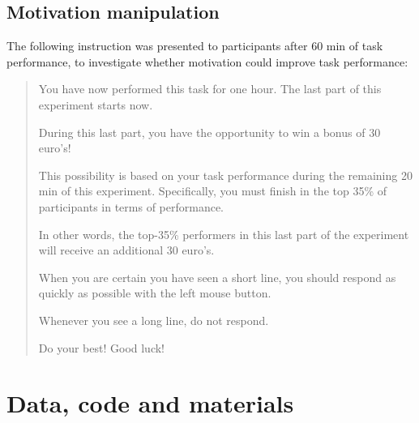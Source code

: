 \documentclass[11pt,]{memoir}
\renewcommand{\arraystretch}{1.5} %
\begin{document}
\hypertarget{motivation-manipulation}{%
\section{Motivation manipulation}\label{motivation-manipulation}}

The following instruction was presented to participants after 60 min of task performance, to investigate whether motivation could improve task performance:

\begin{quote}
You have now performed this task for one hour. The last part of this experiment starts now.

During this last part, you have the opportunity to win a bonus of 30 euro's!

This possibility is based on your task performance during the remaining 20 min of this experiment. Specifically, you must finish in the top 35\% of participants in terms of performance.

In other words, the top-35\% performers in this last part of the experiment will receive an additional 30 euro's.

When you are certain you have seen a short line, you should respond as quickly as possible with the left mouse button.

Whenever you see a long line, do not respond.

Do your best! Good luck!
\end{quote}

\hypertarget{resources-supplement}{%
\chapter{Data, code and materials}\label{resources-supplement}}

\vspace{-12pt}

\begingroup
\renewcommand{\arraystretch}{1}
\setlength{\tabcolsep}{0pt}
\setlength{\LTleft}{-20cm plus -1fill}
\setlength{\LTright}{\LTleft}
\footnotesize
\end{document}
